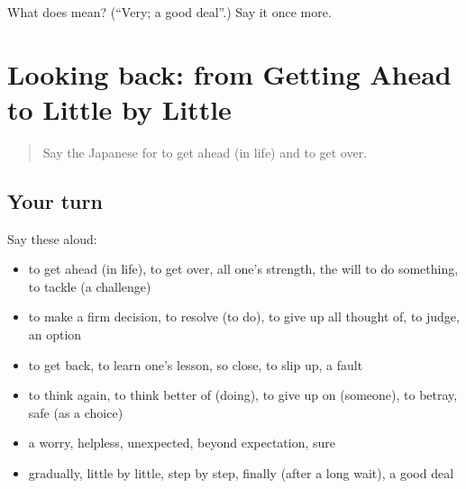 \begin{tcolorbox}[breakable,colback=teal!4,colframe=teal!35!black,title={Before you move on}]
What does  mean? (\textquotedblleft{}Very; a good deal\textquotedblright{}.) Say it once more.
\end{tcolorbox}
\section[(dialogue)]{Looking back: from Getting Ahead to Little by Little}

\label{lesson:JA-R521-review-516-521}



\begin{quote}
Say the Japanese for to get ahead (in life) and to get over.
\end{quote}

\subsection*{Your turn}
Say these aloud:

\begin{itemize}
\raggedright
  \item to get ahead (in life), to get over, all one's strength, the will to do something, to tackle (a challenge)
  \item to make a firm decision, to resolve (to do), to give up all thought of, to judge, an option
  \item to get back, to learn one's lesson, so close, to slip up, a fault
  \item to think again, to think better of (doing), to give up on (someone), to betray, safe (as a choice)
  \item a worry, helpless, unexpected, beyond expectation, sure
  \item gradually, little by little, step by step, finally (after a long wait), a good deal
\end{itemize}

